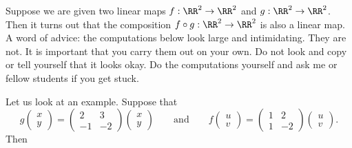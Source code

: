 \documentclass{article}
\begin{document}
Suppose we are given two linear maps $f: \RR^2\rightarrow \RR^2$ and
$g:\RR^2\rightarrow \RR^2$. Then it turns out that the composition
$f\circ g: \RR^2\rightarrow \RR^2$ is also a linear map. A word of advice:
the computations below look large and intimidating. They are not. It
is important that you carry them out on your own. Do not look and copy or tell
yourself that it looks okay. Do the computations yourself and ask me
or fellow students if you get stuck.

Let us look at an example. Suppose that
$$
g\begin{pmatrix} x\\ y \end{pmatrix} =
\begin{pmatrix}
  2 & 3 \\
  -1 & -2
\end{pmatrix}
\begin{pmatrix}
  x \\ y
\end{pmatrix}\qquad
\text{and}
\qquad
f\begin{pmatrix} u\\ v \end{pmatrix} =
\begin{pmatrix}
  1 & 2 \\
  1 & -2
\end{pmatrix}
\begin{pmatrix}
  u \\ v
\end{pmatrix}.
$$
Then
\end{document}
